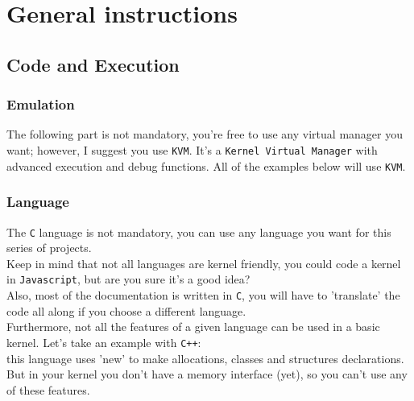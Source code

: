 \documentclass{42-en}
\begin{document}
\chapter{General instructions}
    \section{Code and Execution}
        \subsection{Emulation}
        The following part is not mandatory, you're free to use any virtual
        manager you want; however, I suggest you use \texttt{KVM}.
        It's a \texttt{Kernel Virtual Manager} with advanced execution
        and debug functions.
        All of the examples below will use \texttt{KVM}.
        \subsection{Language}
            The \texttt{C} language is not mandatory, you can use any language
            you want for this series of projects.\\
            Keep in mind that not all languages are kernel friendly, you could
            code a kernel in \texttt{Javascript}, but are you sure it's a
            good idea?\\
            Also, most of the documentation is written in \texttt{C}, you will
            have to 'translate' the code all along if you choose a different
            language.\\

            Furthermore, not all the features of a given language can be used
            in a basic kernel. Let's take an example with \texttt{C++}:\\
            this language uses 'new' to make allocations, classes and
            structures declarations. But in your kernel you don't have a memory
            interface (yet), so you can't use any of these features.\\
\end{document}

